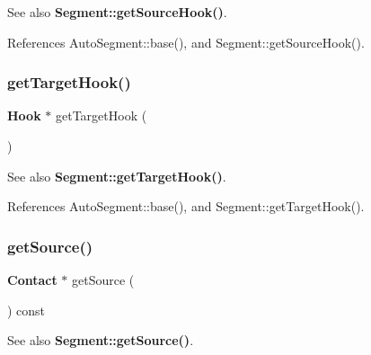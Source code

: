 \begin{DoxySeeAlso}{See also}
\textbf{ Segment\+::get\+Source\+Hook()}. 
\end{DoxySeeAlso}


References Auto\+Segment\+::base(), and Segment\+::get\+Source\+Hook().

\mbox{\label{classKatabatic_1_1AutoSegment_ad62048f68151e5db987b5a7c79cce4ed}} 
\subsubsection{\texorpdfstring{get\+Target\+Hook()}{getTargetHook()}}
{\footnotesize\ttfamily \textbf{ Hook} $\ast$ get\+Target\+Hook (\begin{DoxyParamCaption}{ }\end{DoxyParamCaption})\hspace{0.3cm}{\ttfamily [inline]}}

\begin{DoxySeeAlso}{See also}
\textbf{ Segment\+::get\+Target\+Hook()}. 
\end{DoxySeeAlso}


References Auto\+Segment\+::base(), and Segment\+::get\+Target\+Hook().

\mbox{\label{classKatabatic_1_1AutoSegment_a497ea2ceeddb939dbc84eae0e7862335}} 
\subsubsection{\texorpdfstring{get\+Source()}{getSource()}}
{\footnotesize\ttfamily \textbf{ Contact} $\ast$ get\+Source (\begin{DoxyParamCaption}{ }\end{DoxyParamCaption}) const\hspace{0.3cm}{\ttfamily [inline]}}

\begin{DoxySeeAlso}{See also}
\textbf{ Segment\+::get\+Source()}. 
\end{DoxySeeAlso}


